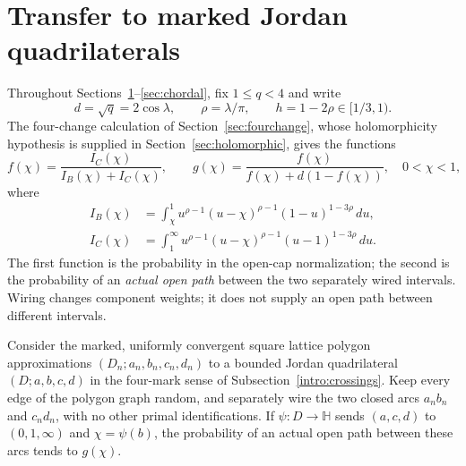 \section{Transfer to marked Jordan quadrilaterals}\label{sec:jordan}

Throughout Sections~\ref{sec:jordan}--\ref{sec:chordal}, fix
$1\le q<4$ and write
\[
 d=\sqrt q=2\cos\lambda,\qquad \rho=\lambda/\pi,
 \qquad h=1-2\rho\in[1/3,1).
\]
The four-change calculation of Section~\ref{sec:fourchange}, whose
holomorphicity hypothesis is supplied in Section~\ref{sec:holomorphic},
gives the functions
\begin{equation}\label{jordan:functions}
 f(\chi)=\frac{I_C(\chi)}{I_B(\chi)+I_C(\chi)},\qquad
 g(\chi)=\frac{f(\chi)}{f(\chi)+d(1-f(\chi))},
 \quad 0<\chi<1,
\end{equation}
where
\begin{align*}
 I_B(\chi)&=\int_\chi^1
 u^{\rho-1}(u-\chi)^{\rho-1}(1-u)^{1-3\rho}\,du,
 \\
 I_C(\chi)&=\int_1^\infty
 u^{\rho-1}(u-\chi)^{\rho-1}(u-1)^{1-3\rho}\,du.
\end{align*}
The first function is the probability in the open-cap normalization;
the second is the probability of an \emph{actual open path} between the
two separately wired intervals.  Wiring changes component weights; it
does not supply an open path between different intervals.

\begin{proposition}\label{jordan:transfer}
Consider the marked, uniformly convergent square lattice polygon
approximations $(D_n;a_n,b_n,c_n,d_n)$ to a bounded Jordan quadrilateral
$(D;a,b,c,d)$ in the four-mark sense of Subsection~\ref{intro:crossings}.
Keep every edge of the polygon graph random, and separately wire the two closed arcs $a_nb_n$ and
$c_nd_n$, with no other primal identifications.  If
$\psi:D\to\mathbb H$ sends $(a,c,d)$ to $(0,1,\infty)$ and
$\chi=\psi(b)$, the probability of an actual open path between these
arcs tends to $g(\chi)$.
\end{proposition}

